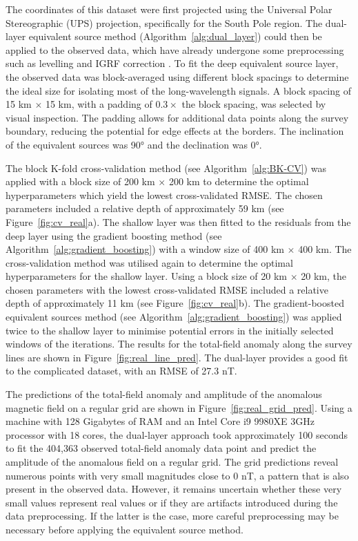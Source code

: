 The coordinates of this dataset were first projected using the Universal Polar Stereographic (UPS) projection, specifically for the South Pole region. The dual-layer equivalent source method (Algorithm~\ref{alg:dual_layer}) could then be applied to the observed data, which have already undergone some preprocessing such as levelling and IGRF correction \citep{ICEGRAV_data}. To fit the deep equivalent source layer, the observed data was block-averaged using different block spacings to determine the ideal size for isolating most of the long-wavelength signals. A block spacing of 15 km $\times$ 15 km, with a padding of $ 0.3 \times $ the block spacing, was selected by visual inspection. The padding allows for additional data points along the survey boundary, reducing the potential for edge effects at the borders. 
The inclination of the equivalent sources was \ang{90} and the declination was \ang{0}.

The block K-fold cross-validation method (see Algorithm~\ref{alg:BK-CV}) was applied with a block size of 200 km $\times$ 200 km to determine the optimal hyperparameters which yield the lowest cross-validated RMSE. The chosen parameters included a relative depth of approximately 59 km (see Figure~\ref{fig:cv_real}a). The shallow layer was then fitted to the residuals from the deep layer using the gradient boosting method (see Algorithm~\ref{alg:gradient_boosting}) with a window size of 400 km $\times$ 400 km. The cross-validation method was utilised again to determine the optimal hyperparameters for the shallow layer. Using a block size of 20 km $\times$ 20 km, the chosen parameters with the lowest cross-validated RMSE included a relative depth of approximately 11 km (see Figure~\ref{fig:cv_real}b). The gradient-boosted equivalent sources method (see Algorithm~\ref{alg:gradient_boosting}) was applied twice to the shallow layer to minimise potential errors in the initially selected windows of the iterations. The results for the total-field anomaly along the survey lines are shown in Figure~\ref{fig:real_line_pred}. The dual-layer provides a good fit to the complicated dataset, with an RMSE of 27.3 nT.

The predictions of the total-field anomaly and amplitude of the anomalous magnetic field on a regular grid are shown in Figure~\ref{fig:real_grid_pred}. Using a machine with 128 Gigabytes of RAM and an Intel Core i9 9980XE 3GHz processor with 18 cores, the dual-layer approach took approximately 100 seconds to fit the 404,363 observed total-field anomaly data point and predict the amplitude of the anomalous field on a regular grid. The grid predictions reveal numerous points with very small magnitudes close to 0 nT, a pattern that is also present in the observed data. However, it remains uncertain whether these very small values represent real values or if they are artifacts introduced during the data preprocessing. If the latter is the case, more careful preprocessing may be necessary before applying the equivalent source method.



